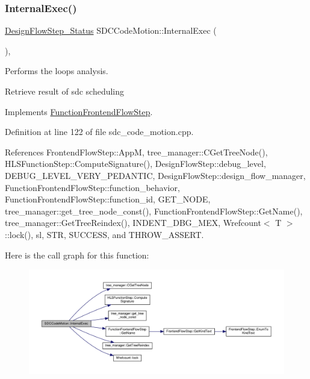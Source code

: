 \subsubsection{\texorpdfstring{Internal\+Exec()}{InternalExec()}}
{\footnotesize\ttfamily \hyperlink{design__flow__step_8hpp_afb1f0d73069c26076b8d31dbc8ebecdf}{Design\+Flow\+Step\+\_\+\+Status} S\+D\+C\+Code\+Motion\+::\+Internal\+Exec (\begin{DoxyParamCaption}{ }\end{DoxyParamCaption})\hspace{0.3cm}{\ttfamily [override]}, {\ttfamily [virtual]}}



Performs the loops analysis. 

Retrieve result of sdc scheduling 

Implements \hyperlink{classFunctionFrontendFlowStep_a00612f7fb9eabbbc8ee7e39d34e5ac68}{Function\+Frontend\+Flow\+Step}.



Definition at line 122 of file sdc\+\_\+code\+\_\+motion.\+cpp.



References Frontend\+Flow\+Step\+::\+AppM, tree\+\_\+manager\+::\+C\+Get\+Tree\+Node(), H\+L\+S\+Function\+Step\+::\+Compute\+Signature(), Design\+Flow\+Step\+::debug\+\_\+level, D\+E\+B\+U\+G\+\_\+\+L\+E\+V\+E\+L\+\_\+\+V\+E\+R\+Y\+\_\+\+P\+E\+D\+A\+N\+T\+IC, Design\+Flow\+Step\+::design\+\_\+flow\+\_\+manager, Function\+Frontend\+Flow\+Step\+::function\+\_\+behavior, Function\+Frontend\+Flow\+Step\+::function\+\_\+id, G\+E\+T\+\_\+\+N\+O\+DE, tree\+\_\+manager\+::get\+\_\+tree\+\_\+node\+\_\+const(), Function\+Frontend\+Flow\+Step\+::\+Get\+Name(), tree\+\_\+manager\+::\+Get\+Tree\+Reindex(), I\+N\+D\+E\+N\+T\+\_\+\+D\+B\+G\+\_\+\+M\+EX, Wrefcount$<$ T $>$\+::lock(), sl, S\+TR, S\+U\+C\+C\+E\+SS, and T\+H\+R\+O\+W\+\_\+\+A\+S\+S\+E\+RT.

Here is the call graph for this function\+:
\nopagebreak
\begin{figure}[H]
\begin{center}
\leavevmode
\includegraphics[width=350pt]{d3/de8/classSDCCodeMotion_aa91dfc60f86626dbb167839a277a201e_cgraph}
\end{center}
\end{figure}


